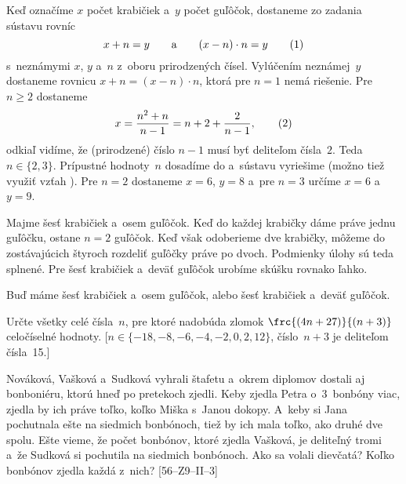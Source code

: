 {%
Keď označíme $x$ počet krabičiek a~$y$ počet guľôčok, dostaneme zo zadania sústavu
rovníc
$$
x+n=y \qquad\hbox{a}\qquad (x-n)\cdot n=y  \tag1
$$
s~neznámymi $x$, $y$ a~$n$ z~oboru prirodzených čísel. Vylúčením neznámej~$y$
dostaneme rovnicu $x+n=(x-n)\cdot n$, ktorá pre $n=1$ nemá riešenie.
Pre $n\ge2$ dostaneme
$$
x={n^2+n\over n-1}=n+2+{2\over n-1}, \tag2
$$
odkiaľ vidíme, že (prirodzené) číslo $n-1$ musí byť deliteľom čísla~$2$. Teda $n\in\{2,3\}$.
Prípustné hodnoty~$n$ dosadíme do  a~sústavu vyriešime (možno tiež využiť vzťah ).
Pre $n=2$ dostaneme $x=6$, $y=8$ a~pre $n=3$ určíme $x=6$ a~$y=9$.

\skuska
Majme šesť krabičiek a~osem guľôčok. Keď do každej krabičky
dáme práve jednu guľôčku, ostane $n=2$ guľôčok. Keď však odoberieme dve
krabičky, môžeme do zostávajúcich štyroch rozdeliť guľôčky práve po dvoch.
Podmienky úlohy sú teda splnené.
Pre šesť krabičiek a~deväť guľôčok urobíme skúšku rovnako ľahko.

\zaver
Buď máme šesť krabičiek a~osem guľôčok, alebo šesť krabičiek
a~deväť guľôčok.

     Určte všetky celé čísla~$n$, pre ktoré nadobúda zlomok $\frc{(4n+27)}{(n+3)}$
     celočíselné hodnoty. [$n\in\{-18,-8,-6,-4,-2,0,2,12\}$, číslo~$n+3$ je
     deliteľom čísla~15.]

   Nováková, Vašková a~Sudková vyhrali štafetu a~okrem diplomov dostali
   aj bonboniéru, ktorú hneď po pretekoch zjedli. Keby zjedla Petra
   o~3~bonbóny viac, zjedla by ich práve toľko, koľko Miška s~Janou dokopy.
   A~keby si Jana pochutnala ešte na siedmich bonbónoch, tiež by ich mala
   toľko, ako druhé dve spolu. Ešte vieme, že počet bonbónov, ktoré zjedla
   Vašková, je deliteľný tromi a~že Sudková si pochutila na siedmich bonbónoch.
   Ako sa volali dievčatá? Koľko bonbónov zjedla každá z~nich?
   [56--Z9--II--3]
}

